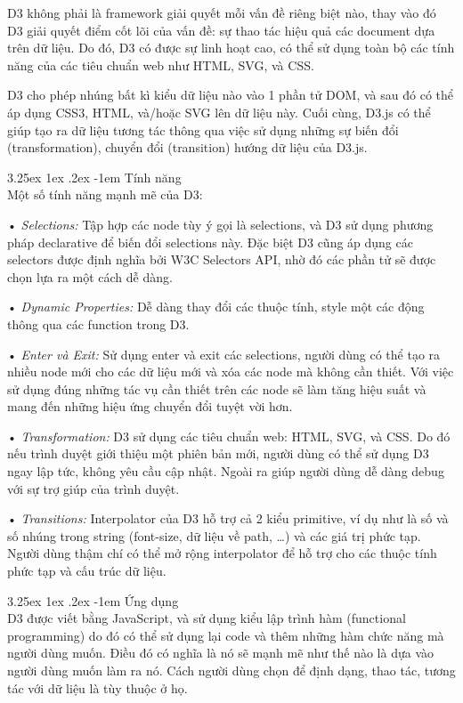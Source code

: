 \documentclass[12pt,a4paper]{article}
\makeatletter
\newcommand{\myparagraph}[1]{\paragraph{#1}\mbox{}\\} %
\renewcommand\paragraph{\@startsection{paragraph}{5}{\z@}%
  {3.25ex \@plus1ex \@minus.2ex}%
  {-1em}%
  {\normalfont\normalsize\bfseries}}
\makeatother
\begin{document}
D3 không phải là framework giải quyết mỗi vấn đề riêng biệt nào, thay vào đó D3 giải quyết điểm cốt lõi của vấn đề: sự thao tác hiệu quả các document dựa trên dữ liệu. Do đó, D3 có được sự linh hoạt cao, có thể sử dụng toàn bộ các tính năng của các tiêu chuẩn web như HTML, SVG, và CSS.

D3 cho phép nhúng bất kì kiểu dữ liệu nào vào 1 phần tử DOM, và sau đó có thể áp dụng CSS3, HTML, và/hoặc SVG lên dữ liệu này. Cuối cùng, D3.js có thể giúp tạo ra dữ liệu tương tác thông qua việc sử dụng những sự biến đổi (transformation), chuyển đổi (transition) hướng dữ liệu của D3.js.

\myparagraph{Tính năng}
Một số tính năng mạnh mẽ của D3:
\begin{list}{}{}
\item[•] \emph{Selections:} Tập hợp các node tùy ý gọi là selections, và D3 sử dụng phương pháp declarative để biến đổi selections này. Đặc biệt D3 cũng áp dụng các selectors được định nghĩa bởi W3C Selectors API, nhờ đó các phần tử sẽ được chọn lựa ra một cách dễ dàng.
\item[•] \emph{Dynamic Properties:} Dễ dàng thay đổi các thuộc tính, style một các động thông qua các function trong D3.
\item[•] \emph{Enter và Exit:} Sử dụng enter và exit các selections, người dùng có thể tạo ra nhiều node mới cho các dữ liệu mới và xóa các node mà không cần thiết. Với việc sử dụng đúng những tác vụ cần thiết trên các node sẽ làm tăng hiệu suất và mang đến những hiệu ứng chuyển đổi tuyệt vời hơn.
\item[•] \emph{Transformation:} D3 sử dụng các tiêu chuẩn web: HTML, SVG, và CSS. Do đó nếu trình duyệt giới thiệu một phiên bản mới, người dùng có thể sử dụng D3 ngay lập tức, không yêu cầu cập nhật. Ngoài ra giúp người dùng dễ dàng debug với sự trợ giúp của trình duyệt.
\item[•] \emph{Transitions:} Interpolator của D3 hỗ trợ cả 2 kiểu primitive, ví dụ như là số và số nhúng trong string (font-size, dữ liệu về path, …) và các giá trị phức tạp. Người dùng thậm chí có thể mở rộng interpolator để hỗ trợ cho các thuộc tính phức tạp và cấu trúc dữ liệu.
\end{list}

\myparagraph{Ứng dụng}
D3 được viết bằng JavaScript, và sử dụng kiểu lập trình hàm (functional programming) do đó có thể sử dụng lại code và thêm những hàm chức năng mà người dùng muốn. Điều đó có nghĩa là nó sẽ mạnh mẽ như thế nào là dựa vào người dùng muốn làm ra nó. Cách người dùng chọn để định dạng, thao tác, tương tác với dữ liệu là tùy thuộc ở họ.
\end{document}
